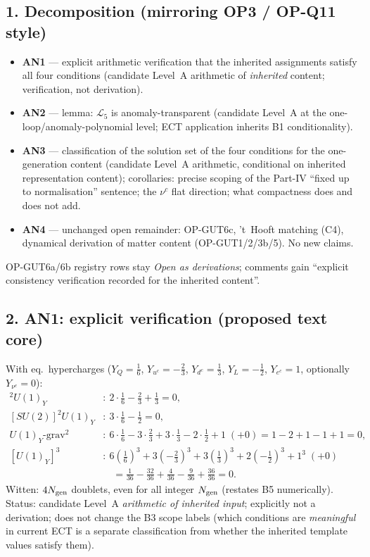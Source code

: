 \subsection*{1. Decomposition (mirroring OP3 / OP-Q11 style)}
\begin{itemize}
  \item \textbf{AN1} --- explicit arithmetic verification that the
    inherited assignments satisfy all four conditions
    (candidate Level~A arithmetic of \emph{inherited} content;
    verification, not derivation).
  \item \textbf{AN2} --- lemma: $\mathcal L_5$ is anomaly-transparent
    (candidate Level~A at the one-loop/anomaly-polynomial level;
    ECT application inherits B1 conditionality).
  \item \textbf{AN3} --- classification of the solution set of the
    four conditions for the one-generation content (candidate
    Level~A arithmetic, conditional on inherited representation
    content); corollaries: precise scoping of the Part-IV
    ``fixed up to normalisation'' sentence; the $\nu^c$ flat
    direction; what compactness does and does not add.
  \item \textbf{AN4} --- unchanged open remainder: OP-GUT6c,
    't~Hooft matching (C4), dynamical derivation of matter content
    (OP-GUT1/2/3b/5). No new claims.
\end{itemize}
OP-GUT6a/6b registry rows stay \emph{Open as derivations}; comments
gain ``explicit consistency verification recorded for the inherited
content''.

\subsection*{2. AN1: explicit verification (proposed text core)}
With eq.~hypercharges
($Y_Q=\tfrac16$, $Y_{u^c}=-\tfrac23$, $Y_{d^c}=\tfrac13$,
$Y_L=-\tfrac12$, $Y_{e^c}=1$, optionally $Y_{\nu^c}=0$):
\begin{align*}
[SU(3)]^2U(1)_Y&:\ 2\cdot\tfrac16-\tfrac23+\tfrac13=0,\\
[SU(2)]^2U(1)_Y&:\ 3\cdot\tfrac16-\tfrac12=0,\\
U(1)_Y\text{-grav}^2&:\ 6\cdot\tfrac16-3\cdot\tfrac23+3\cdot\tfrac13
  -2\cdot\tfrac12+1\;(+0)=1-2+1-1+1=0,\\
[U(1)_Y]^3&:\ 6(\tfrac16)^3+3(-\tfrac23)^3+3(\tfrac13)^3
  +2(-\tfrac12)^3+1^3\;(+0)\\
 &\quad=\tfrac1{36}-\tfrac{32}{36}+\tfrac{4}{36}-\tfrac{9}{36}
  +\tfrac{36}{36}=0.
\end{align*}
Witten: $4N_{\rm gen}$ doublets, even for all integer
$N_{\rm gen}$ (restates B5 numerically).
Status: candidate Level~A \emph{arithmetic of inherited input};
explicitly not a derivation; does not change the B3 scope labels
(which conditions are \emph{meaningful} in current ECT is a separate
classification from whether the inherited template values satisfy
them).

